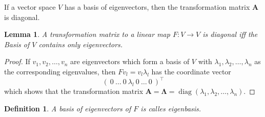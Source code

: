\documentclass[a4paper,12pt]{article}
\newcommand{\A}{\mat{A}}
\newcommand{\diag}{\operatorname{diag}}
\newcommand{\mat}[1]{\mathbf{#1}}
\theoremstyle{plain}
\newtheorem{defn}{Definition}[section]
\newtheorem{lemma}{Lemma}[section]
\numberwithin{equation}{section}
\begin{document}
If a vector space $V$ has a basis of eigenvectors, then the transformation matrix
$\A$ is diagonal.

\begin{lemma}
    A transformation matrix to a linear map $F \colon V \rightarrow V$ is diagonal
    iff the Basis of $V$ contains only eigenvectors.
\end{lemma}

\begin{proof}
    If $v_1, v_2, \dots, v_n$ are eigenvectors which form a basis of $V$ with
    $\lambda_1, \lambda_2, \dots, \lambda_n$ as the corresponding eigenvalues, then
    $F v_l = v_l \lambda_l$ has the coordinate vector
    \[
        (\ 0\ \dots\ 0\ \lambda_l\ 0\ \dots\ 0\ )^\intercal
    \]
which shows that the transformation matrix $\A = \mat{\Lambda} = \diag(\lambda_1, \lambda_2, \dots, \lambda_n)$.
\end{proof}

\begin{defn}
    A basis of eigenvectors of $F$ is calles eigenbasis.
\end{defn}
\end{document}
